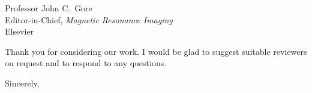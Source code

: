\documentclass[11pt]{letter}
\begin{document}
\begin{letter}{Professor John C.\ Gore \\ Editor-in-Chief, \textit{Magnetic Resonance Imaging}
\\ Elsevier}

Thank you for considering our work. I would be glad to suggest suitable reviewers on request
and to respond to any questions.

\closing{Sincerely,}

\end{letter}
\end{document}
